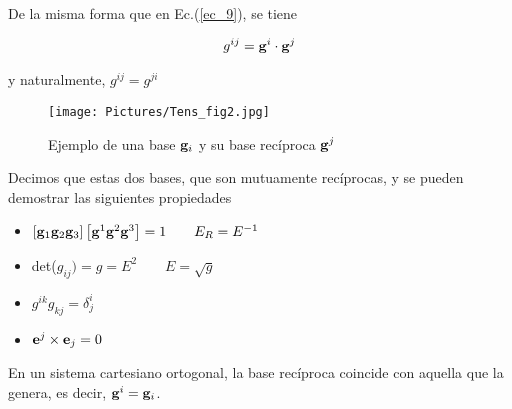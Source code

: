\bigskip


De la misma forma que en Ec.(\ref{ec_9}), se tiene 

\bigskip

\begin{eqnarray}\label{ec_14}
g^{ij}= \bold{g}^{i}\cdot \bold{g}^{j}
\end{eqnarray}


\bigskip
\noindent
y naturalmente,  $g^{ij}= g^{ji}$

\bigskip

\begin{figure}
\begin{center}
\texttt{[image: Pictures/Tens\_fig2.jpg]}
\caption{Ejemplo de una base $\bold{g}_{i}$ y su base recíproca $\bold{g}^{j}$}
\label{Tens_fig2}
\end{center}
\end{figure}

Decimos que estas dos bases, que son mutuamente recíprocas, y se pueden demostrar las siguientes propiedades

\bigskip

\begin{itemize}
\item
$\left[  \bold{g}_{1}\bold{g}_{2} \bold{g}_{3} \right]\left[  \bold{g}^{1}\bold{g}^{2} \bold{g}^{3} \right]=1 \qquad  E_R= E^{-1}  $

\bigskip
\item

det($g_{ij})=g=E^{2} \qquad  E=\sqrt{g}  $

\bigskip

\item

$g^{ik}g_{kj}=\delta^{i}_{j}$

\bigskip
\item
$\bold{e}^{j}\times \bold{e}_{j}=0$
\end{itemize}

\bigskip


En un sistema cartesiano ortogonal, la base recíproca  coincide con aquella que la genera, es decir, $\bold{g}^{i}= \bold{g}_{i} $.

\bigskip

